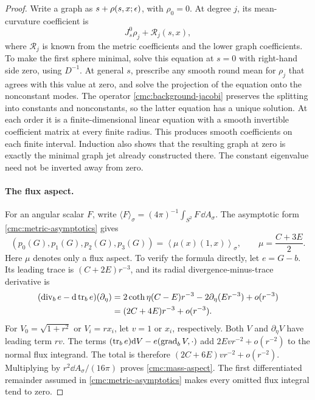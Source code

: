 \begin{proof}
Write a graph as \(s+\rho(s,x;\epsilon)\), with \(\rho_0=0\).
At degree \(j\), its mean-curvature coefficient is
\[
 J_s^0\rho_j+\mathcal R_j(s,x),
\]
where \(\mathcal R_j\) is known from the metric coefficients and the
lower graph coefficients.  To make the first sphere minimal, solve
this equation at \(s=0\) with right-hand side zero, using \(D^{-1}\).
At general \(s\), prescribe any smooth round mean for \(\rho_j\) that
agrees with this value at zero, and solve the projection of the
equation onto the nonconstant modes.
The operator \eqref{cmc:background-jacobi} preserves the splitting
into constants and nonconstants, so the latter equation has a unique
solution.  At each order it is a finite-dimensional linear equation
with a smooth invertible coefficient matrix at every finite radius.
This produces smooth coefficients on each finite interval.
Induction also shows that the resulting graph at zero is exactly the
minimal graph jet already constructed there.
The constant eigenvalue need not be inverted away from zero.

\paragraph{The flux aspect.}
For an angular scalar \(F\), write
\(\langle F\rangle_\sigma=(4\pi)^{-1}\int_{S^2}F\,\dd A_\sigma\).
The asymptotic form \eqref{cmc:metric-asymptotics} gives
\begin{equation}\label{cmc:mass-aspect}
 (p_0(G),p_1(G),p_2(G),p_3(G))
 =\left\langle\mu(x)(1,x)\right\rangle_\sigma,
 \qquad \mu=\frac{C+3E}{2}.
\end{equation}
Here \(\mu\) denotes only a flux aspect.
To verify the formula directly, let \(e=G-b\).  Its leading trace is
\((C+2E)r^{-3}\), and its radial divergence-minus-trace derivative is
\begin{align*}
 (\operatorname{div}_b e-\mathrm{d}\operatorname{tr}_b e)(\partial_\eta)
 &=2\coth\eta(C-E)r^{-3}
       -2\partial_\eta(Er^{-3})+o(r^{-3})\\
 &=(2C+4E)r^{-3}+o(r^{-3}).
\end{align*}
For \(V_0=\sqrt{1+r^2}\) or \(V_i=rx_i\), let \(v=1\) or \(x_i\),
respectively.  Both \(V\) and \(\partial_\eta V\) have leading term
\(rv\).  The terms \((\operatorname{tr}_b e)\mathrm{d} V-e(\operatorname{grad}_bV,\cdot)\) add
\(2Ev r^{-2}+o(r^{-2})\) to the normal flux integrand.
The total is therefore
\((2C+6E)v r^{-2}+o(r^{-2})\).
Multiplying by \(r^2\dd A_\sigma/(16\pi)\) proves
\eqref{cmc:mass-aspect}.  The first differentiated remainder assumed
in \eqref{cmc:metric-asymptotics} makes every omitted flux integral
tend to zero.


\end{proof}
